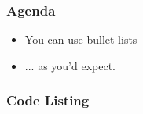 \begin{frame}
  \titlepage
\end{frame}

\begin{frame}
  \frametitle{Agenda}
  \begin{itemize}
    \item You can use bullet lists
    \item ... as you'd expect.
  \end{itemize}
\end{frame}

\begin{frame}
\end{frame}

\begin{frame}
\end{frame}

\begin{frame}
\end{frame}

\begin{frame}
  \frametitle{Code Listing}
  
\end{frame}
